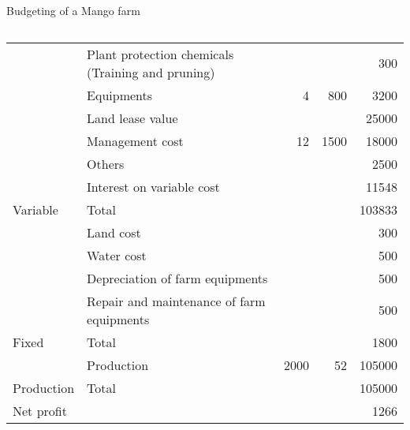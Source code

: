 \documentclass[12pt,ignorenonframetext,aspectratio=169]{beamer}
\begin{document}
\begin{frame}{Budgeting of a Mango farm}
\begin{columns}
\begin{column}{0.8\textwidth}
{\begin{minipage}{1.2\textwidth}
\begin{table}[H]
\begin{tabular}{llrrr}
 & Plant protection chemicals (Training and pruning) &  &  & 300\\

 & Equipments & 4 & 800 & 3200\\

 & Land lease value &  &  & 25000\\

 & Management cost & 12 & 1500 & 18000\\

 & Others &  &  & 2500\\

 & Interest on variable cost &  &  & 11548\\

\multirow{-17}{*}{\raggedright\arraybackslash Variable} & Total &  &  & 103833\\
\cmidrule{1-5}
 & Land cost &  &  & 300\\

 & Water cost &  &  & 500\\

 & Depreciation of farm equipments &  &  & 500\\

 & Repair and maintenance of farm equipments &  &  & 500\\

\multirow{-5}{*}{\raggedright\arraybackslash Fixed} & Total &  &  & 1800\\
\cmidrule{1-5}
 & Production & 2000 & 52 & 105000\\

\multirow{-2}{*}{\raggedright\arraybackslash Production} & Total &  &  & 105000\\
\cmidrule{1-5}
Net profit &  &  &  & 1266\\
\bottomrule
\end{tabular}
\endgroup{}
\end{table}
\end{minipage}}

\end{column}

\end{columns}
\end{frame}
\end{document}
